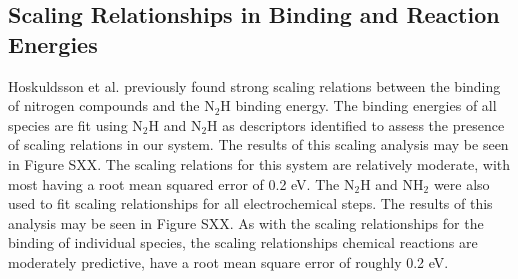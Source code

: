 
\subsection{Scaling Relationships in Binding and Reaction Energies}
\label{sec:scaling}

Hoskuldsson et al. \cite{Hoskuldsson_2017} previously found strong scaling relations between the binding of nitrogen compounds and the N$_2$H binding energy.  The binding energies of all species are fit using N$_2$H and N$_2$H as descriptors identified to assess the presence of scaling relations in our system. The results of this scaling analysis may be seen in Figure SXX. The scaling relations for this system are relatively moderate, with most having a root mean squared error of 0.2 eV. The N$_2$H and NH$_2$ were also used to fit scaling relationships for all electrochemical steps. The results of this analysis may be seen in Figure SXX. As with the scaling relationships for the binding of individual species, the scaling relationships chemical reactions are moderately predictive, have a root mean square error of roughly 0.2 eV.


